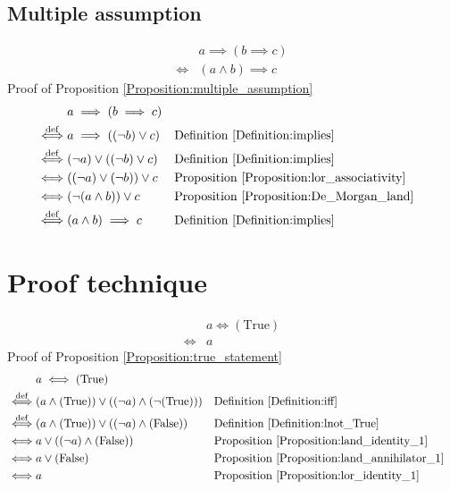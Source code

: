 \subsection{Multiple assumption}
\begin{prop}
\label{Proposition:multiple_assumption}
\begin{align*}
& a \implies (b \implies c) \\
\iff & (a \land b) \implies c
\end{align*}
Proof of Proposition \ref{Proposition:multiple_assumption}
\begin{align*}
& a \implies (b \implies c) \\
\overset{\operatorname{def}}{\iff} & a \implies ((\lnot b) \lor c)
& & \text{Definition \ref{Definition:implies}} \\
\overset{\operatorname{def}}{\iff} & (\lnot a) \lor ((\lnot b) \lor c)
& & \text{Definition \ref{Definition:implies}} \\
\iff & ((\lnot a) \lor (\lnot b)) \lor c
& & \text{Proposition \ref{Proposition:lor_associativity}} \\
\iff & (\lnot (a \land b)) \lor c
& & \text{Proposition \ref{Proposition:De_Morgan_land}} \\
\overset{\operatorname{def}}{\iff} & (a \land b) \implies c
& & \text{Definition \ref{Definition:implies}} \\
\end{align*}
\end{prop}

\section{Proof technique}
\begin{prop}
\label{Proposition:true_statement}
\begin{align*}
& a \iff (\text{True}) \\
\iff & a
\end{align*}
Proof of Proposition \ref{Proposition:true_statement}
\begin{align*}
& a \iff (\text{True}) \\
\overset{\operatorname{def}}{\iff} & (a \land (\text{True})) \lor ((\lnot a) \land (\lnot (\text{True})))
& & \text{Definition \ref{Definition:iff}} \\
\overset{\operatorname{def}}{\iff} & (a \land (\text{True})) \lor ((\lnot a) \land (\text{False}))
& & \text{Definition \ref{Definition:lnot_True}} \\
\iff & a \lor ((\lnot a) \land (\text{False}))
& & \text{Proposition \ref{Proposition:land_identity_1}} \\
\iff & a \lor (\text{False})
& & \text{Proposition \ref{Proposition:land_annihilator_1}} \\
\iff & a
& & \text{Proposition \ref{Proposition:lor_identity_1}} \\
\end{align*}
\end{prop}

